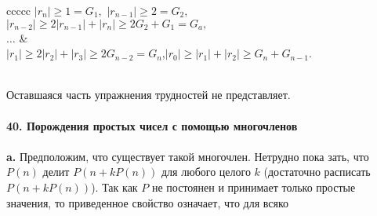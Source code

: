 \documentclass{../../template/mai_book}
\begin{document}
		\begin{array}{ccccc}
				$|r_n| \geq 1 = G_1,$ $|r_{n-1}| \geq 2 = G_2,$\\
				$|r_{n-2}| \geq 2|r_{n-1}| + |r_n| \geq 2G_2 + G_1 = G_a,$\\
				$\ldots$                                                                                         & \\
				$|r_1| \geq 2|r_2|+ |r_3| \geq 2G_{n-2} = G_n$,$ |r_0| \geq |r_1| + |r_2| \geq G_n + G_{n-1}.$\\
		\end{array}\\
Оставшаяся часть упражнения трудностей не представляет.\\
\\
\noindent\textbf{40. Порождения простых чисел с помощью многочленов}\\
\\
\hspace*{15pt}\textbf{a.} Предположим, что существует такой многочлен. Нетрудно пока­\linebreak
зать, что $P(n)$ делит $P(n + kP(n))$ для любого целого $k$ (достаточно\linebreak
расписать $P(n + kP(n))$). Так как $P$ не постоянен и принимает только\linebreak
простые значения, то приведенное свойство означает, что для всяко­\linebreak
\end{document}
